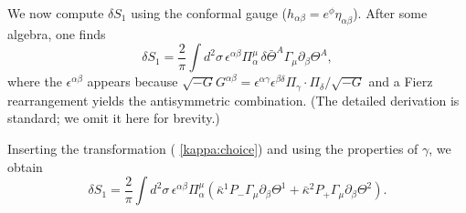 \documentclass[12pt]{article}
\newcommand{\cbar}{\bar{\kappa}}
\begin{document}
We now compute $\delta S_1$ using the conformal gauge ($h_{\alpha\beta}=e^\phi\eta_{\alpha\beta}$). After some algebra, one finds
\[
\delta S_1 = \frac{2}{\pi}\int d^2\sigma\, \epsilon^{\alpha\beta} \Pi^\mu_\alpha\, \delta\bar{\Theta}^A \Gamma_\mu \partial_\beta\Theta^A,
\]
where the $\epsilon^{\alpha\beta}$ appears because $\sqrt{-G}G^{\alpha\beta} = \epsilon^{\alpha\gamma}\epsilon^{\beta\delta}\Pi_\gamma\cdot\Pi_\delta / \sqrt{-G}$ and a Fierz rearrangement yields the antisymmetric combination. (The detailed derivation is standard; we omit it here for brevity.)

Inserting the transformation ( \ref{kappa:choice}) and using the properties of $\gamma$, we obtain
\[
\delta S_1 = \frac{2}{\pi}\int d^2\sigma\, \epsilon^{\alpha\beta} \Pi^\mu_\alpha \left( \cbar^1 P_- \Gamma_\mu \partial_\beta\Theta^1 + \cbar^2 P_+ \Gamma_\mu \partial_\beta\Theta^2 \right).
\]
\end{document}
